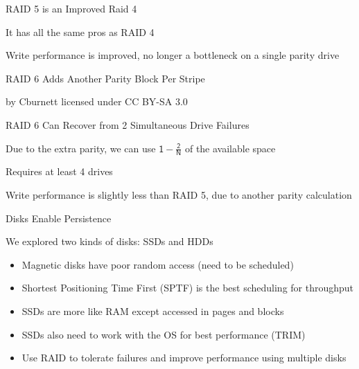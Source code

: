   \begin{frame}{RAID 5 is an Improved Raid 4}

    It has all the same pros as RAID 4

    \vspace{2em}

    Write performance is improved, no longer a bottleneck on a single parity
    drive
  \end{frame}

  \begin{frame}{RAID 6 Adds Another Parity Block Per Stripe}
    \begin{center}
      
    \end{center}

    \begin{flushright}
      by Cburnett licensed under CC BY-SA 3.0
    \end{flushright}
  \end{frame}

  \begin{frame}{RAID 6 Can Recover from 2 Simultaneous Drive Failures}

    Due to the extra parity, we can use $\mathsf{1 - \frac{2}{N}}$ of the available space

    \hspace{2em} Requires at least 4 drives

    \vspace{2em}

    Write performance is slightly less than RAID 5, due to another parity calculation
  \end{frame}

  \begin{frame}{Disks Enable Persistence}

    We explored two kinds of disks: SSDs and HDDs
    \begin{itemize}
      \item Magnetic disks have poor random access (need to be scheduled)
      \item Shortest Positioning Time First (SPTF) is the best scheduling for throughput
      \item SSDs are more like RAM except accessed in pages and blocks
      \item SSDs also need to work with the OS for best performance (TRIM)
      \item Use RAID to tolerate failures and improve performance using multiple disks
    \end{itemize}
  \end{frame}


